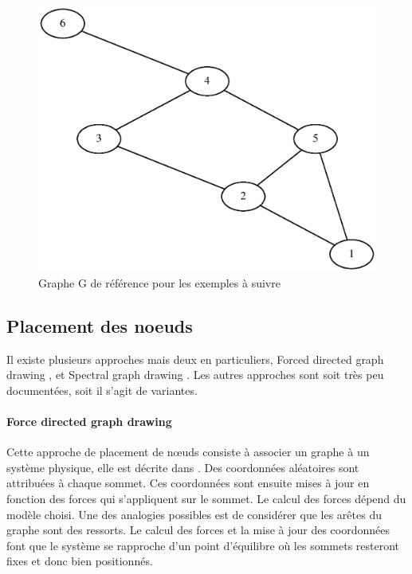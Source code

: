 \documentclass[a4paper, 11pt]{article}
\begin{document}
\begin{figure}[!htb]
  \begin{center}
    \includegraphics[scale=0.6]{contents/graphe}
  \end{center}
  \caption{Graphe G de référence pour les exemples à suivre}
  \label{fig:greference}
\end{figure}

\subsection{Placement des noeuds}
Il existe plusieurs approches mais deux en particuliers, Forced directed graph drawing \cite{forced_theorie}, et Spectral graph drawing \cite{spectral_theorie}. Les autres approches sont soit très peu documentées, soit il s'agit de variantes.

\paragraph{Force directed graph drawing}

Cette approche de placement de nœuds consiste à associer un graphe à un système physique, elle est décrite dans \cite{forced_theorie}. Des coordonnées aléatoires sont attribuées à chaque sommet. Ces coordonnées sont ensuite mises à jour en fonction des forces qui s'appliquent sur le sommet. Le calcul des forces dépend du modèle choisi. Une des analogies possibles est de considérer que les arêtes du graphe sont des ressorts. Le calcul des forces et la mise à jour des coordonnées font que le système se rapproche d'un point d'équilibre où les sommets resteront fixes et donc bien positionnés.
\end{document}

